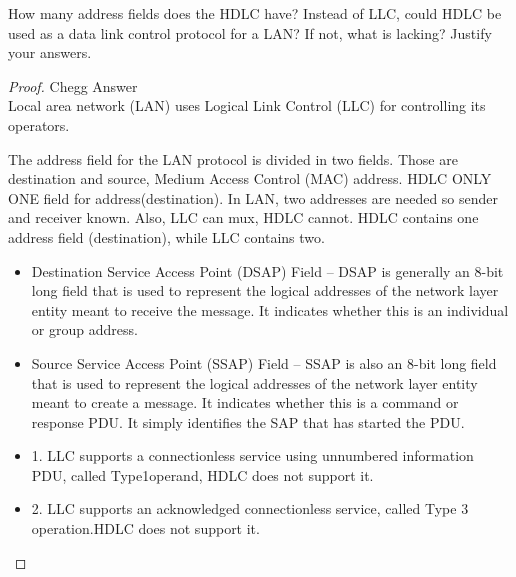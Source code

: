 \documentclass[./answersheet.tex]{subfiles}
\begin{document}
\begin{wts}
How many address fields does the HDLC have? Instead of LLC, could HDLC be used as a data link control protocol for a LAN? If not, what is lacking? Justify your answers.
\end{wts}
\begin{proof}
Chegg Answer\\
        Local area network (LAN) uses Logical Link Control (LLC) for controlling its operators.

        The address field for the LAN protocol is divided in two fields. Those are destination and source, Medium Access Control (MAC) address. HDLC ONLY ONE field for address(destination). In LAN, two addresses are needed so sender and receiver known. Also,  LLC can mux, HDLC cannot. HDLC contains one address field (destination), while LLC contains two.

        \begin{itemize} 
            \item Destination Service Access Point (DSAP) Field – 
            DSAP is generally an 8-bit long field that is used to represent the logical addresses of the network layer entity meant to receive the message. It indicates whether this is an individual or group address. 
     
            \item Source Service Access Point (SSAP) Field – 
            SSAP is also an 8-bit long field that is used to represent the logical addresses of the network layer entity meant to create a message. It indicates whether this is a command or response PDU. It simply identifies the SAP that has started the PDU. 
            \item 1. LLC supports a connectionless service using unnumbered information PDU, called Type1operand, HDLC does not support it.
            \item 2. LLC supports an acknowledged connectionless service, called Type 3 operation.HDLC does not support it.
        \end{itemize}
\end{proof}
\end{document}
